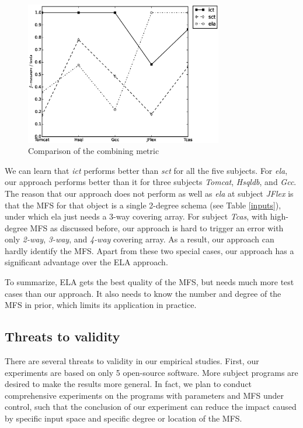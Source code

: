 \documentclass{sig-alternate}
\begin{document}
\begin{figure}[htbp]
 \includegraphics[width=3.4in]{result.eps}
\caption{Comparison of the combining metric}
\label{cm_performance}
\end{figure}

We can learn that \emph{ict} performs better than \emph{sct} for all the five subjects.  For \emph{ela}, our approach performs better than it for three subjects \emph{Tomcat}, \emph{Hsqldb}, and \emph{Gcc}. The reason that our approach does not perform as well as \emph{ela} at subject \emph{JFlex} is that the MFS for that object is a single 2-degree schema (see Table \ref{inputs}), under which ela just needs a 3-way covering array.  For subject \emph{Tcas}, with high-degree MFS as discussed before, our approach is hard to trigger an error with only \emph{2-way}, \emph{3-way}, and \emph{4-way} covering array. As a result, our approach can hardly identify the MFS. Apart from these two special cases, our approach has a significant advantage over the ELA approach.

To summarize, ELA gets the best quality of the MFS, but needs much more test cases than our approach.  It also needs to know the number and degree of the MFS in prior, which limits its application in practice.
%



\subsection{Threats to validity}

There are several threats to validity in our empirical studies. First, our experiments are based on only 5 open-source software. More subject programs are desired to make the results more general. In fact, we plan to conduct comprehensive experiments on the programs with parameters and MFS under control, such that the conclusion of our experiment can reduce the impact caused by specific input space and specific degree or location of the MFS.
\end{document}
